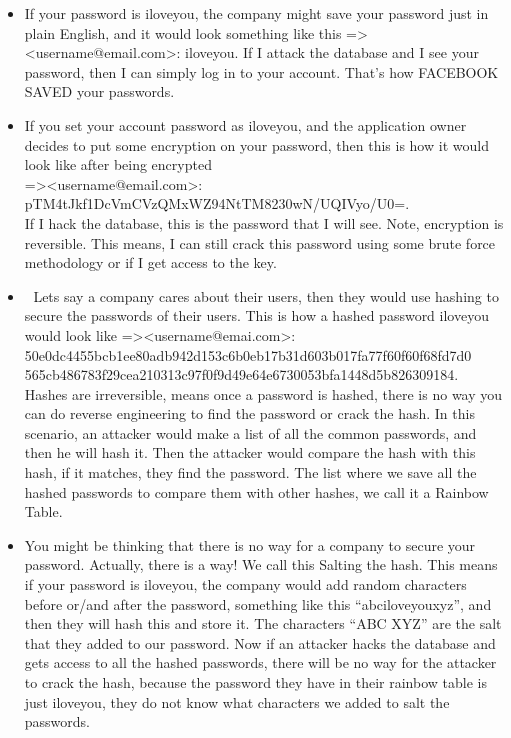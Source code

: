 \documentclass{article}
\begin{document}
\begin{itemize}
   \item If your password is iloveyou, the company might save your password just in plain English, and it would look something like this => <username@email.com>: iloveyou. If I attack the database and I see your password, then I can simply log in to your account. That’s how FACEBOOK SAVED your passwords.
   \item If you set your account password as iloveyou, and the application owner decides to put some encryption on your password, then this is how it would look like after being encrypted \\
   =\textgreater \textless username@email.com\textgreater:\\ pTM4tJkf1DcVmCVzQMxWZ94NtTM8230wN/UQIVyo/U0=.\\ If I hack the database, this is the password that I will see. Note, encryption is reversible. This means, I can still crack this password using some brute force methodology or if I get access to the key.
   \item 	Lets say a company cares about their users, then they would use hashing to secure the passwords of their users. This is how a hashed password iloveyou would look like =\textgreater \textless username@emai.com\textgreater:\\ 50e0dc4455bcb1ee80adb942d153c6b0eb17b31d603b017fa77f60f60f68fd7d0\\565cb486783f29cea210313c97f0f9d49e64e6730053bfa1448d5b826309184.\\ Hashes are irreversible, means once a password is hashed, there is no way you can do reverse engineering to find the password or crack the hash. In this scenario, an attacker would make a list of all the common passwords, and then he will hash it. Then the attacker would compare the hash with this hash, if it matches, they find the password. The list where we save all the hashed passwords to compare them with other hashes, we call it a Rainbow Table.
   \item You might be thinking that there is no way for a company to secure your password. Actually, there is a way! We call this Salting the hash. This means if your password is iloveyou, the company would add random characters before or/and after the password, something like this “abciloveyouxyz”, and then they will hash this and store it. The characters “ABC XYZ” are the salt that they added to our password. Now if an attacker hacks the database and gets access to all the hashed passwords, there will be no way for the attacker to crack the hash, because the password they have in their rainbow table is just iloveyou, they do not know what characters we added to salt the passwords.
 \end{itemize}
\end{document}
